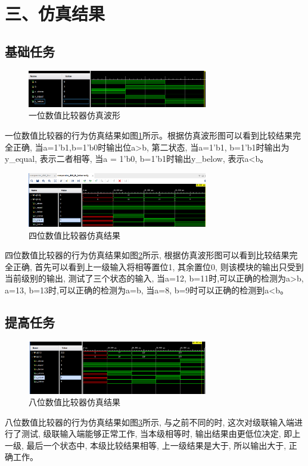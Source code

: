 \documentclass{article}
\newcommand{\fourhao}{\fontsize{14pt}{\baselineskip}\selectfont} %
\newcommand{\xiaosihao}{\fontsize{12pt}{\baselineskip}\selectfont} %
\begin{document}
\section*{\fourhao 三、仿真结果}
\xiaosihao
{}
\subsection*{基础任务}
\begin{figure}[H]
    \centering
    \includegraphics[width=0.7\textwidth]{image/2024-06-14-20-08-22.png}
    \caption{一位数值比较器仿真波形}
    \label{image_1bit_sim}
\end{figure}
一位数值比较器的行为仿真结果如图\ref{image_1bit_sim}所示。根据仿真波形图可以看到比较结果完全正确, 当a=1'b1,b=1'b0时输出位a>b, 
第二状态, 当a=1'b1, b=1'b1时输出为y\_equal, 表示二者相等, 当a = 1'b0, b=1'b1时输出y\_below, 表示a<b。\\
\begin{figure}[H]
    \centering
    \includegraphics[width=0.7\textwidth]{image/2024-06-15-20-28-49.png}
    \caption{四位数值比较器仿真结果}
    \label{image_4bit_sim}
\end{figure}
四位数值比较器的行为仿真结果如图\ref{image_4bit_sim}所示, 根据仿真波形图可以看到比较结果完全正确, 首先可以看到上一级输入将相等置位1, 其余置位0, 则该模块的输出只受到当前级别的输出, 
测试了三个状态的输入, 当a=12, b=11时,可以正确的检测为a>b, a=13, b=13时,可以正确的检测为a=b, 当a=8, b=9时可以正确的检测到a<b。
\subsection*{提高任务}
\begin{figure}[H]
    \centering
    \includegraphics[width=0.7\textwidth]{image/2024-06-15-21-15-24.png}
    \caption{八位数值比较器仿真结果}
    \label{image_8bit_sim}
\end{figure}
八位数值比较器的行为仿真结果如图\ref{image_8bit_sim}所示, 与之前不同的时, 这次对级联输入端进行了测试, 级联输入端能够正常工作, 当本级相等时, 输出结果由更低位决定, 即上一级, 最后一个状态中, 本级比较结果相等, 上一级结果是大于, 所以输出大于, 正确工作。\\
\end{document}
